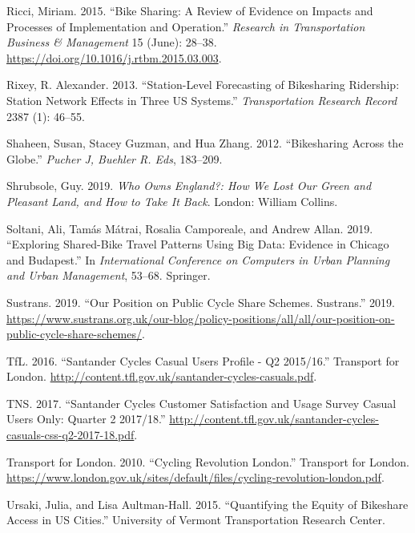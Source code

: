 \documentclass[]{article}
\begin{document}
\leavevmode\hypertarget{ref-ricci_bike_2015}{}%
Ricci, Miriam. 2015. ``Bike Sharing: A Review of Evidence on Impacts and Processes of Implementation and Operation.'' \emph{Research in Transportation Business \& Management} 15 (June): 28--38. \url{https://doi.org/10.1016/j.rtbm.2015.03.003}.

\leavevmode\hypertarget{ref-rixey_station-level_2013}{}%
Rixey, R. Alexander. 2013. ``Station-Level Forecasting of Bikesharing Ridership: Station Network Effects in Three US Systems.'' \emph{Transportation Research Record} 2387 (1): 46--55.

\leavevmode\hypertarget{ref-shaheen_bikesharing_2012}{}%
Shaheen, Susan, Stacey Guzman, and Hua Zhang. 2012. ``Bikesharing Across the Globe.'' \emph{Pucher J, Buehler R. Eds}, 183--209.

\leavevmode\hypertarget{ref-shrubsole_who_2019}{}%
Shrubsole, Guy. 2019. \emph{Who Owns England?: How We Lost Our Green and Pleasant Land, and How to Take It Back}. London: William Collins.

\leavevmode\hypertarget{ref-soltani_exploring_2019}{}%
Soltani, Ali, Tamás Mátrai, Rosalia Camporeale, and Andrew Allan. 2019. ``Exploring Shared-Bike Travel Patterns Using Big Data: Evidence in Chicago and Budapest.'' In \emph{International Conference on Computers in Urban Planning and Urban Management}, 53--68. Springer.

\leavevmode\hypertarget{ref-sustrans_our_2019}{}%
Sustrans. 2019. ``Our Position on Public Cycle Share Schemes. Sustrans.'' 2019. \url{https://www.sustrans.org.uk/our-blog/policy-positions/all/all/our-position-on-public-cycle-share-schemes/}.

\leavevmode\hypertarget{ref-tfl_santander_2016}{}%
TfL. 2016. ``Santander Cycles Casual Users Profile - Q2 2015/16.'' Transport for London. \url{http://content.tfl.gov.uk/santander-cycles-casuals.pdf}.

\leavevmode\hypertarget{ref-tns_santander_2017}{}%
TNS. 2017. ``Santander Cycles Customer Satisfaction and Usage Survey Casual Users Only: Quarter 2 2017/18.'' \url{http://content.tfl.gov.uk/santander-cycles-casuals-css-q2-2017-18.pdf}.

\leavevmode\hypertarget{ref-transport_for_london_cycling_2010}{}%
Transport for London. 2010. ``Cycling Revolution London.'' Transport for London. \url{https://www.london.gov.uk/sites/default/files/cycling-revolution-london.pdf}.

\leavevmode\hypertarget{ref-ursaki_quantifying_2015}{}%
Ursaki, Julia, and Lisa Aultman-Hall. 2015. ``Quantifying the Equity of Bikeshare Access in US Cities.'' University of Vermont Transportation Research Center.
\end{document}
